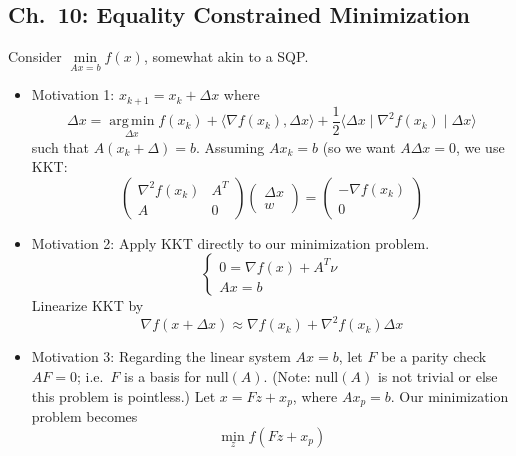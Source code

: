 \documentclass[english, 11pt]{article}
\DeclareMathOperator*{\argmin}{arg\,min}
\begin{document}
\subsection{Ch.\ 10: Equality Constrained Minimization}
Consider $\min \limits_{Ax=b} f(x)$, somewhat akin to a SQP. 
\begin{itemize}
\item Motivation 1: $x_{k+1} = x_k + \Delta x$ where 
\[
\Delta x = \argmin \limits_{\Delta x} f(x_k) + \langle \nabla f(x_k), \Delta x \rangle + \frac{1}{2} \langle \Delta x \mid \nabla^2 f(x_k) \mid \Delta x \rangle
\]
such that $A(x_k + \Delta ) = b$. Assuming $Ax_k = b$ (so we want $A \Delta x =0$, we use KKT:
\[
\begin{pmatrix} \nabla^2 f(x_k) & A^T \\ A & 0 \end{pmatrix} \begin{pmatrix} \Delta x \\ w \end{pmatrix} = \begin{pmatrix} - \nabla f(x_k) \\ 0 \end{pmatrix}
\]



\item Motivation 2: Apply KKT directly to our minimization problem.
\[
\begin{cases}
0 = \nabla f(x) + A^T \nu \\
Ax=b
\end{cases}
\]
Linearize KKT by
\[
\nabla f(x + \Delta x) \approx \nabla f(x_k) + \nabla^2 f(x_k) \Delta x
\]

\item Motivation 3: Regarding the linear system $Ax=b$, let $F$ be a parity check $AF=0$; i.e.\ $F$ is a basis for null$(A)$. (Note: null$(A)$ is not trivial or else this problem is pointless.) Let $x = F z + x_p$, where $Ax_p = b$. Our minimization problem becomes
\[
\min \limits_z f(Fz+x_p)
\]
\end{itemize}
\end{document}
